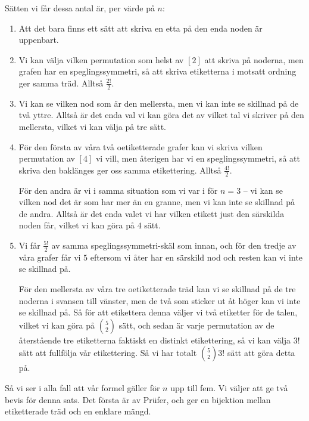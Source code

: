 \documentclass[nobib]{tufte-handout}
\begin{document}
Sätten vi får dessa antal är, per värde på $n$:
\begin{enumerate}
    \item Att det bara finns ett sätt att skriva en etta på den enda noden är uppenbart.
    \item Vi kan välja vilken permutation som helst av $[2]$ att skriva på noderna, men grafen har en speglingssymmetri, så att skriva etiketterna i motsatt ordning ger samma träd. Alltså $\frac{2!}{2}$.
    \item Vi kan se vilken nod som är den mellersta, men vi kan inte se skillnad på de två yttre. Alltså är det enda val vi kan göra det av vilket tal vi skriver på den mellersta, vilket vi kan välja på tre sätt.
    \item För den första av våra två oetiketterade grafer kan vi skriva vilken permutation av $[4]$ vi vill, men återigen har vi en speglingssymmetri, så att skriva den baklänges ger oss samma etikettering. Alltså $\frac{4!}{2}$.
    
    För den andra är vi i samma situation som vi var i för $n=3$ -- vi kan se vilken nod det är som har mer än en granne, men vi kan inte se skillnad på de andra. Alltså är det enda valet vi har vilken etikett just den särskilda noden får, vilket vi kan göra på $4$ sätt.
    \item Vi får $\frac{5!}{2}$ av samma speglingssymmetri-skäl som innan, och för den tredje av våra grafer får vi $5$ eftersom vi åter har en särskild nod och resten kan vi inte se skillnad på.
    
    För den mellersta av våra tre oetiketterade träd kan vi se skillnad på de tre noderna i svansen till vänster, men de två som sticker ut åt höger kan vi inte se skillnad på. Så för att etikettera denna väljer vi två etiketter för de talen, vilket vi kan göra på $\binom{5}{2}$ sätt, och sedan är varje permutation av de återstående tre etiketterna faktiskt en distinkt etikettering, så vi kan välja $3!$ sätt att fullfölja vår etikettering. Så vi har totalt $\binom{5}{2}3!$ sätt att göra detta på.
\end{enumerate}

Så vi ser i alla fall att vår formel gäller för $n$ upp till fem. Vi väljer att ge två bevis för denna sats. Det första är av Prüfer, och ger en bijektion mellan etiketterade träd och en enklare mängd.
\end{document}
